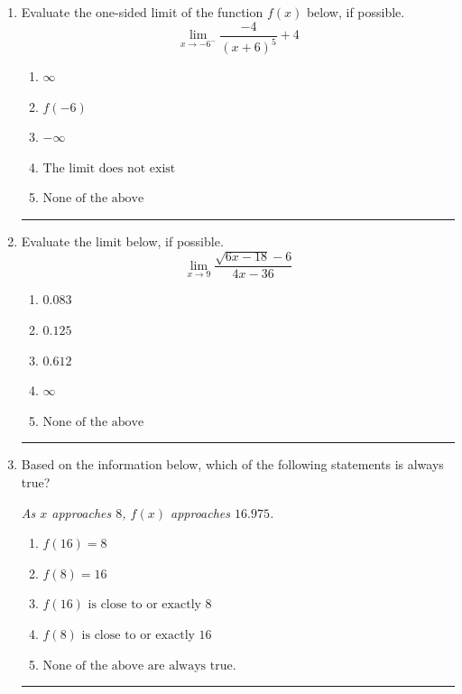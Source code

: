 \documentclass[14pt]{extbook}
\newcommand{\litem}[1]{\item#1\hspace*{-1cm}\rule{\textwidth}{0.4pt}}
\begin{document}
\begin{enumerate}
\litem{
Evaluate the one-sided limit of the function $f(x)$ below, if possible.\[ \lim_{x \rightarrow -6^-} \frac{-4}{(x+6)^5}+4 \]\begin{enumerate}[label=\Alph*.]
\item \( \infty \)
\item \( f(-6) \)
\item \( -\infty \)
\item \( \text{The limit does not exist} \)
\item \( \text{None of the above} \)

\end{enumerate} }
\litem{
Evaluate the limit below, if possible.\[ \lim_{x \rightarrow 9} \frac{\sqrt{6x - 18} - 6}{4x - 36} \]\begin{enumerate}[label=\Alph*.]
\item \( 0.083 \)
\item \( 0.125 \)
\item \( 0.612 \)
\item \( \infty \)
\item \( \text{None of the above} \)

\end{enumerate} }
\litem{
Based on the information below, which of the following statements is always true?
\begin{center}
    \textit{ As $x$ approaches $8$, $f(x)$ approaches $16.975$. }
\end{center}
\begin{enumerate}[label=\Alph*.]
\item \( f(16) = 8 \)
\item \( f(8) = 16 \)
\item \( f(16) \text{ is close to or exactly } 8 \)
\item \( f(8) \text{ is close to or exactly } 16 \)
\item \( \text{None of the above are always true.} \)


\end{enumerate}}
\end{enumerate}
\end{document}
